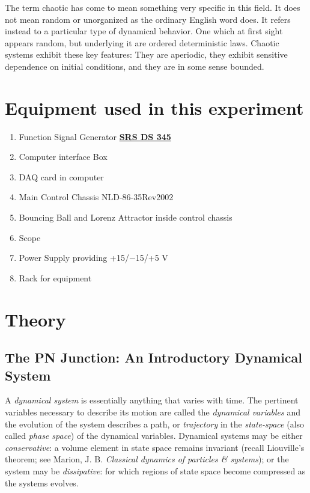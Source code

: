\documentclass{../lab}
\begin{document}
The term chaotic has come to mean something very specific in this field. It does not mean random or unorganized as the ordinary English word does. It refers instead to a particular type of dynamical behavior. One which at first sight appears random, but underlying it are ordered deterministic laws. Chaotic systems exhibit these key features: They are aperiodic, they exhibit sensitive dependence on initial conditions, and they are in some sense bounded.

\section{Equipment used in this experiment}

\begin{enumerate}
    \item Function Signal Generator \href{https://youtu.be/PrM8DHFOFS0}{\textbf{SRS DS 345}}

    \item Computer interface Box

    \item DAQ card in computer

    \item Main Control Chassis NLD-86-35Rev2002

    \item Bouncing Ball and Lorenz Attractor inside control chassis

    \item Scope

    \item Power Supply providing +15/$-$15/+5 V

    \item Rack for equipment
\end{enumerate}

\section{Theory}

\subsection{The PN Junction: An Introductory Dynamical System}

A \emph{dynamical system} is essentially anything that varies with time. The pertinent variables necessary to describe its motion are called the \emph{dynamical variables} and the evolution of the system describes a path, or \emph{trajectory} in the \emph{state-space} (also called \emph{phase space}) of the dynamical variables. Dynamical systems may be either \emph{conservative}: a volume element in state space remains invariant (recall Liouville's theorem; see Marion, J. B. \emph{Classical dynamics of particles \& systems}); or the system may be \emph{dissipative}: for which regions of state space become compressed as the systems evolves.
\end{document}
